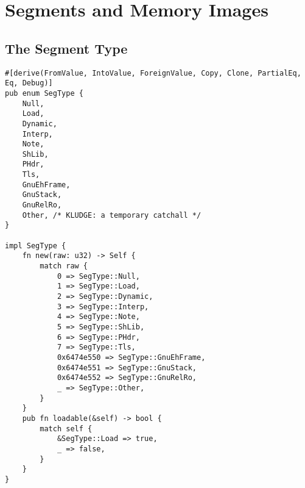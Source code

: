 \documentclass[11pt]{article}
\begin{document}
\section{Segments and Memory Images}
\label{sec:orgbd1c54b}

\subsection{The Segment Type}
\label{sec:org3d588f5}

\lstset{language=rust,label=org55e1a13,caption= ,captionpos=b,numbers=none}
\begin{lstlisting}
#[derive(FromValue, IntoValue, ForeignValue, Copy, Clone, PartialEq, Eq, Debug)]
pub enum SegType {
    Null,
    Load,
    Dynamic,
    Interp,
    Note,
    ShLib,
    PHdr,
    Tls,
    GnuEhFrame,
    GnuStack,
    GnuRelRo,
    Other, /* KLUDGE: a temporary catchall */
}

impl SegType {
    fn new(raw: u32) -> Self {
        match raw {
            0 => SegType::Null,
            1 => SegType::Load,
            2 => SegType::Dynamic,
            3 => SegType::Interp,
            4 => SegType::Note,
            5 => SegType::ShLib,
            6 => SegType::PHdr,
            7 => SegType::Tls,
            0x6474e550 => SegType::GnuEhFrame,
            0x6474e551 => SegType::GnuStack,
            0x6474e552 => SegType::GnuRelRo,
            _ => SegType::Other,
        }
    }
    pub fn loadable(&self) -> bool {
        match self {
            &SegType::Load => true,
            _ => false,
        }
    }
}
\end{lstlisting}
\end{document}
